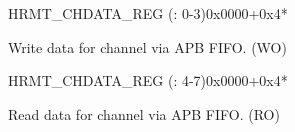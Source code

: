 \begin{register}{H}{RMT\_CHDATA\_REG (: 0-3)}{0x0000+0x4*}\label{regdesc:RMTCHNDATAREG}
%
\regnewline%
\begin{regdesc}\begin{reglist}
\label{fielddesc:RMTCHNDATA}\item [RMT\_CH\regindex{n}DATA] Write data for channel  via APB FIFO. (WO)
\end{reglist}\end{regdesc}
\end{register}


\begin{register}{H}{RMT\_CHDATA\_REG (: 4-7)}{0x0000+0x4*}\label{regdesc:RMTCHMDATAREG}
%
\regnewline%
\begin{regdesc}\begin{reglist}
\label{fielddesc:RMTCHMDATA}\item [RMT\_CH\regindex{m}DATA] Read data for channel  via APB FIFO. (RO)
\end{reglist}\end{regdesc}
\end{register}


